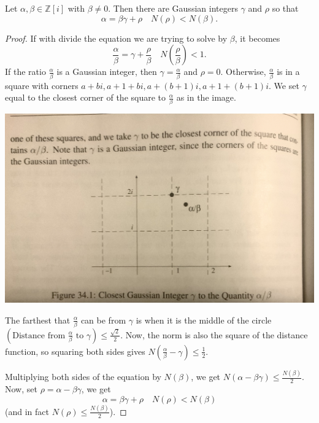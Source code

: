 \documentclass{ximera}
\begin{document}
\begin{theorem}
 Let $\alpha,\beta\in\mathbb{Z}[i]$ with $\beta\neq 0$. Then there are Gaussian integers $\gamma$ and $\rho$ so that 
 \[\alpha=\beta\gamma+\rho\quad N(\rho)<N(\beta).\]
\end{theorem}
\begin{proof}
 If with divide the equation we are trying to solve by $\beta$, it becomes \[\frac{\alpha}{\beta}=\gamma+\frac{\rho}{\beta}\quad N(\frac{\rho}{\beta})<1.\]
 If the ratio $\frac{\alpha}{\beta}$ is a Gaussian integer, then $\gamma=\frac{\alpha}{\beta}$ and $\rho=0$. Otherwise, $\frac{\alpha}{\beta}$ is in a square with corners $a+bi, a+1+bi, a+(b+1)i,a+1+(b+1)i.$ We set $\gamma$ equal to the closest corner of the square to $\frac{\alpha}{\beta}$ as in the image.
 
\begin{image}
  \includegraphics{IMG_0229.jpg}
\end{image}

The farthest that $\frac{\alpha}{\beta}$ can be from $\gamma$ is when it is the middle of the circle $(\textrm{Distance from $\frac{\alpha}{\beta}$ to $\gamma$})\leq\frac{\sqrt{2}}{2}$. Now, the norm is also the square of the distance function, so squaring both sides gives $N(\frac{\alpha}{\beta}-\gamma)\leq \frac{1}{2}$.

Multiplying both sides of the equation by $N(\beta)$, we get $N(\alpha-\beta\gamma)\leq \frac{N(\beta)}{2}.$ Now, set $\rho=\alpha-\beta\gamma$, we get  \[\alpha=\beta\gamma+\rho\quad N(\rho)<N(\beta)\]
(and in fact $N(\rho)\leq \frac{N(\beta)}{2}$).
\end{proof}
\end{document}
